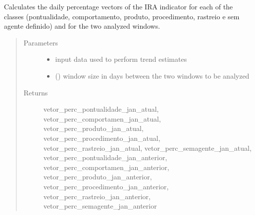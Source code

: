 \documentclass[letterpaper,10pt,english]{sphinxmanual}
\begin{document}
\begin{fulllineitems}
\label{\detokenize{algorithms:algorithms.eti.eti.calc_vector_perc_daily_ira}}
\sphinxAtStartPar
Calculates the daily percentage vectors of the IRA indicator for each of the classes (pontualidade, comportamento,
produto, procedimento, rastreio e sem agente definido) and for the two analyzed windows.
\begin{quote}\begin{description}
\item[{Parameters}] \leavevmode\begin{itemize}
\item {} 
\sphinxAtStartPar
{} \textendash{} input data used to perform trend estimates

\item {} 
\sphinxAtStartPar
{} () \textendash{} window size in days between the two windows to be analyzed

\end{itemize}

\item[{Returns}] \leavevmode
\sphinxAtStartPar
vetor\_perc\_pontualidade\_jan\_atual, vetor\_perc\_comportamen\_jan\_atual, vetor\_perc\_produto\_jan\_atual,
vetor\_perc\_procedimento\_jan\_atual, vetor\_perc\_rastreio\_jan\_atual, vetor\_perc\_semagente\_jan\_atual,
vetor\_perc\_pontualidade\_jan\_anterior, vetor\_perc\_comportamen\_jan\_anterior, vetor\_perc\_produto\_jan\_anterior,
vetor\_perc\_procedimento\_jan\_anterior, vetor\_perc\_rastreio\_jan\_anterior, vetor\_perc\_semagente\_jan\_anterior

\end{description}\end{quote}

\end{fulllineitems}

\end{document}
